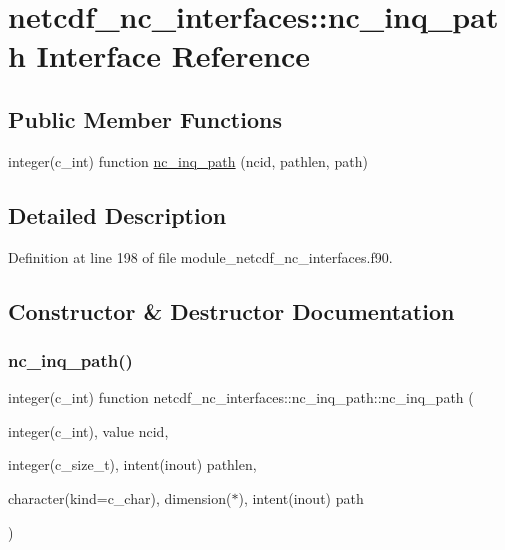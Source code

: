 \hypertarget{interfacenetcdf__nc__interfaces_1_1nc__inq__path}{}\section{netcdf\+\_\+nc\+\_\+interfaces\+:\+:nc\+\_\+inq\+\_\+path Interface Reference}
\label{interfacenetcdf__nc__interfaces_1_1nc__inq__path}
\subsection*{Public Member Functions}
\begin{DoxyCompactItemize}
\item 
integer(c\+\_\+int) function \hyperlink{interfacenetcdf__nc__interfaces_1_1nc__inq__path_a1717188dd33ad3922414b218b454bef3}{nc\+\_\+inq\+\_\+path} (ncid, pathlen, path)
\end{DoxyCompactItemize}


\subsection{Detailed Description}


Definition at line 198 of file module\+\_\+netcdf\+\_\+nc\+\_\+interfaces.\+f90.



\subsection{Constructor \& Destructor Documentation}
\mbox{\label{interfacenetcdf__nc__interfaces_1_1nc__inq__path_a1717188dd33ad3922414b218b454bef3}} 
\subsubsection{\texorpdfstring{nc\+\_\+inq\+\_\+path()}{nc\_inq\_path()}}
{\footnotesize\ttfamily integer(c\+\_\+int) function netcdf\+\_\+nc\+\_\+interfaces\+::nc\+\_\+inq\+\_\+path\+::nc\+\_\+inq\+\_\+path (\begin{DoxyParamCaption}\item[{integer(c\+\_\+int), value}]{ncid,  }\item[{integer(c\+\_\+size\+\_\+t), intent(inout)}]{pathlen,  }\item[{character(kind=c\+\_\+char), dimension($\ast$), intent(inout)}]{path }\end{DoxyParamCaption})}




